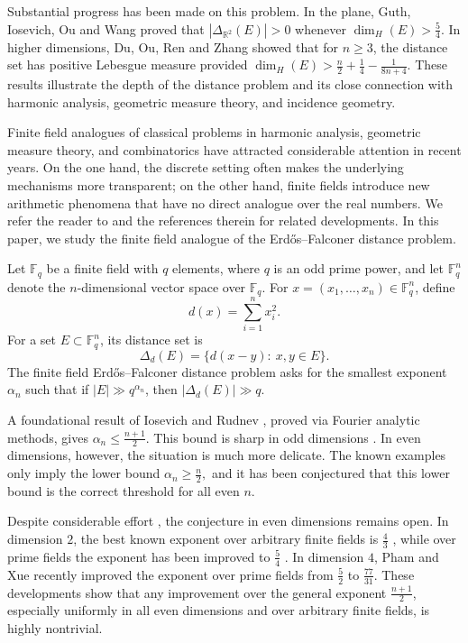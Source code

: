 \documentclass[11pt]{article}
\newcommand{\1}{\mathbf{1}}
\begin{document}
Substantial progress has been made on this problem. In the plane, Guth, Iosevich, Ou and Wang \cite{GIOW2020} proved that \(|\Delta_{\mathbb{R}^2}(E)|>0\) whenever $\dim_H(E)>\frac54.$
In higher dimensions, Du, Ou, Ren and Zhang \cite{DORZ23} showed that for \(n\ge 3\), the distance set has positive Lebesgue measure provided $\dim_H(E)>
\frac n2+\frac14-\frac{1}{8n+4}.$
These results illustrate the depth of the distance problem and its close connection with harmonic analysis, geometric measure theory, and incidence geometry.

Finite field analogues of classical problems in harmonic analysis, geometric measure theory, and combinatorics have attracted considerable attention in recent years. On the one hand, the discrete setting often makes the underlying mechanisms more transparent; on the other hand, finite fields introduce new arithmetic phenomena that have no direct analogue over the real numbers. We refer the reader to \cite{BKT2004,IR2007,MT2004,W1999} and the references therein for related developments. In this paper, we study the finite field analogue of the Erd\H{o}s--Falconer distance problem.

Let \(\mathbb{F}_q\) be a finite field with \(q\) elements, where \(q\) is an odd prime power, and let \(\mathbb{F}_q^n\) denote the \(n\)-dimensional vector space over \(\mathbb{F}_q\). For \(x=(x_1,\dots,x_n)\in \mathbb{F}_q^n\), define
\[
d(x)=\sum_{i=1}^n x_i^2.
\]
For a set \(E\subset \mathbb{F}_q^n\), its distance set is
\[
\Delta_d(E)
=
\{d(x-y):\ x,y\in E\}.
\]
The finite field Erd\H{o}s--Falconer distance problem asks for the smallest exponent \(\alpha_n\) such that if $|E|\gg q^{\alpha_n}$, then $|\Delta_d(E)|\gg q.$

A foundational result of Iosevich and Rudnev \cite{IR2007}, proved via Fourier analytic methods, gives $\alpha_n\le \frac{n+1}{2}.$
This bound is sharp in odd dimensions \cite{HIKR2011}. In even dimensions, however, the situation is much more delicate. The known examples only imply the lower bound $\alpha_n\ge \frac n2,$
and it has been conjectured that this lower bound is the correct threshold for all even \(n\).

Despite considerable effort \cite{CEHIK2012,CGKPTZ25,F24,KS2015,KPSV2021,KPV2021,KPP2023,MPPRS2022,PS2020,PVZ2019}, the conjecture in even dimensions remains open. In dimension \(2\), the best known exponent over arbitrary finite fields is \(\frac{4}{3}\) \cite{BHIPR2017,CEHIK2012}, while over prime fields the exponent has been improved to \(\frac{5}{4}\) \cite{MPPRS2022}. In dimension \(4\), Pham and Xue \cite{PX26} recently improved the exponent over prime fields from \(\frac{5}{2}\) to \(\frac{77}{31}\). These developments show that any improvement over the general exponent \(\frac{n+1}{2}\), especially uniformly in all even dimensions and over arbitrary finite fields, is highly nontrivial.
\end{document}
